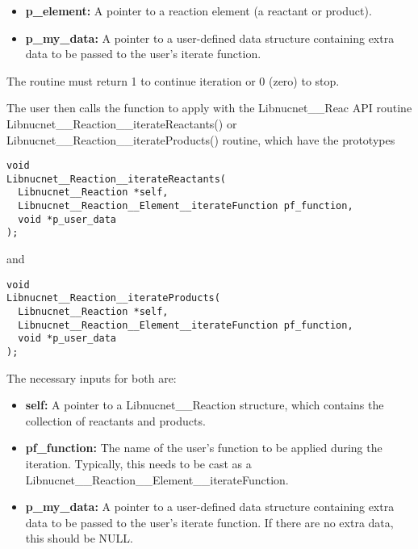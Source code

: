 \documentclass{article}    %
\begin{document}
\begin{itemize}

\item {\bf p\_element:}  A pointer to a reaction element
(a reactant or product).

\item {\bf p\_my\_data:}  A pointer to a user-defined data structure containing
extra data to be passed to the user's iterate function.

\end{itemize}

\noindent
The routine must return 1 to continue iteration or 0 (zero) to stop.

The user then calls the function to apply with the Libnucnet\_\_Reac API
routine Libnucnet\_\_Reaction\_\_iterateReactants() or
Libnucnet\_\_Reaction\_\_iterateProducts() routine, which have the prototypes

\begin{verbatim}
void
Libnucnet__Reaction__iterateReactants(
  Libnucnet__Reaction *self,
  Libnucnet__Reaction__Element__iterateFunction pf_function,
  void *p_user_data
);
\end{verbatim}

\noindent and

\begin{verbatim}
void
Libnucnet__Reaction__iterateProducts(
  Libnucnet__Reaction *self,
  Libnucnet__Reaction__Element__iterateFunction pf_function,
  void *p_user_data
);
\end{verbatim}

\noindent
The necessary inputs for both are:

\begin{itemize}

\item {\bf self:} A pointer to a Libnucnet\_\_Reaction structure, which contains
the collection of reactants and products.

\item {\bf pf\_function:} The name of the user's function to be applied
during the iteration.
Typically, this needs to be cast as a
Libnucnet\_\_Reaction\_\_Element\_\_iterateFunction.

\item {\bf p\_my\_data:}  A pointer to a user-defined data structure containing
extra data to be passed to the user's iterate function.  If there are
no extra data, this should be NULL.

\end{itemize}
\end{document}
